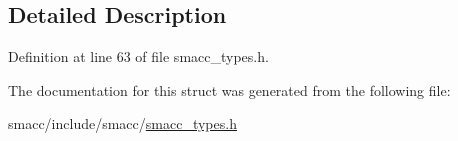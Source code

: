\subsection{Detailed Description}


Definition at line 63 of file smacc\+\_\+types.\+h.



The documentation for this struct was generated from the following file\+:\begin{DoxyCompactItemize}
\item 
smacc/include/smacc/\hyperlink{smacc__types_8h}{smacc\+\_\+types.\+h}\end{DoxyCompactItemize}
